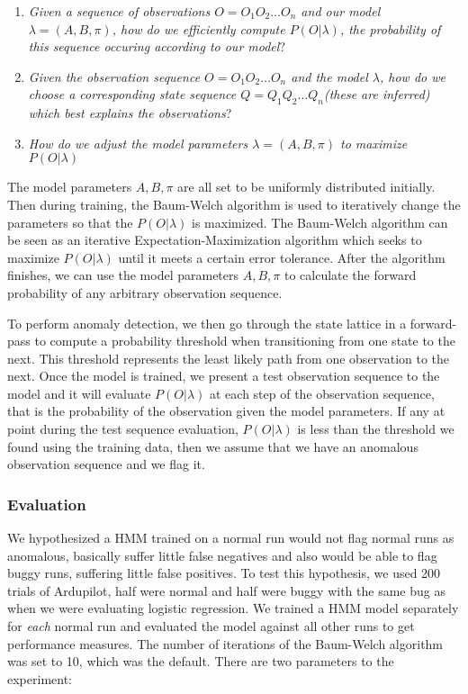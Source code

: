 \begin{enumerate}
  \item \emph{Given a sequence of observations $O = O_1O_2 \hdots O_n$
  and our model $\lambda = (A, B, \pi)$, how do we efficiently compute
  $P(O|\lambda)$, the probability of this sequence occuring according
  to our model}?
  \item \emph{Given the observation sequence $O = O_1O_2 \hdots O_n$
    and the model $\lambda$, how do we choose a corresponding state
    sequence $Q = Q_1Q_2 \hdots Q_n$(these are inferred) which best
    explains the observations}?
  \item \emph{How do we adjust the model parameters $\lambda = (A, B, \pi)$ to
    maximize $P(O|\lambda)$}
\end{enumerate}

The model parameters $A, B, \pi$ are all set to be uniformly
distributed initially. Then during training, the Baum-Welch
algorithm is used to iteratively change the parameters so that the
$P(O|\lambda)$ is maximized. The Baum-Welch algorithm can be seen as
an iterative Expectation-Maximization algorithm
\cite{dempster77} which seeks to maximize $P(O|\lambda)$ until it
meets a certain error tolerance. After the algorithm finishes, we can
use the model parameters $A, B, \pi$ to calculate the forward
probability of any arbitrary observation sequence.

To perform anomaly detection, we then go through the state lattice in
a forward-pass to compute a probability threshold when transitioning
from one state to the next. This threshold represents the least
likely path from one observation to the next. Once the model is
trained, we present a test observation sequence to the model and it
will evaluate $P(O|\lambda)$ at each step of the observation sequence,
that is the probability of the observation given the model
parameters. If any at point during the test sequence evaluation,
$P(O|\lambda)$ is less than the threshold we found using the training
data, then we assume that we have an anomalous observation sequence
and we flag it. 

\subsubsection{Evaluation}

We hypothesized a HMM trained
on a normal run would not flag normal runs as anomalous, basically suffer little
false negatives and also would be able to flag buggy runs, suffering
little false positives. To test this hypothesis, we used 200 trials of
Ardupilot, half were normal and half were buggy with the same bug as
when we were evaluating logistic regression. We trained a HMM model
separately for \emph{each} normal run and evaluated the model against
all other runs to get performance measures. The number of iterations
of the Baum-Welch algorithm was set to 10, which was the
default. There are two parameters to the experiment:

